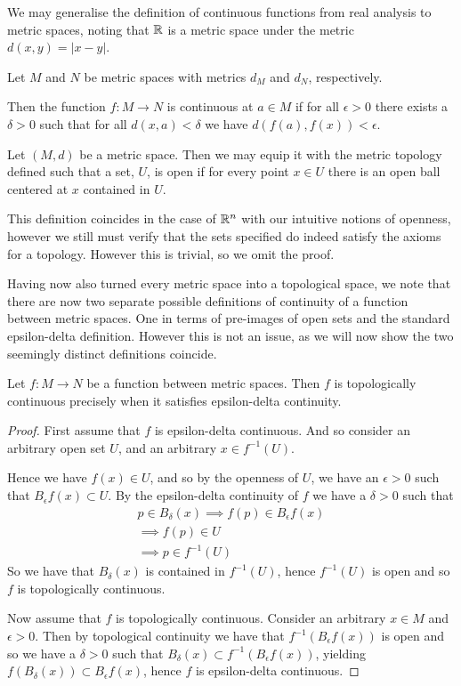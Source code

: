 \documentclass[]{article}
\begin{document}
We may generalise the definition of continuous functions from real analysis to metric spaces, noting that $\mathbb{R}$ is a metric space under the metric $d(x,y) = |x-y|$.

\begin{defi} [Continuity]
		Let $M$ and $N$ be metric spaces with metrics $d_M$ and $d_N$, respectively. 

		Then the function $f: M \to N$ is continuous at $a \in M$ if for all $\epsilon > 0$ there exists a $\delta > 0$ such that for all $d(x,a) < \delta$ we have $d(f(a), f(x)) < \epsilon$.
\end{defi}

\begin{defi} 
		Let $(M,d)$ be a metric space. Then we may equip it with the metric topology defined such that a set, $U$, is open if for every point $x \in U$ there is an open ball centered at $x$ contained in $U$.
\end{defi}

This definition coincides in the case of $\mathbb{R}^n$ with our intuitive notions of openness, however we still must verify that the sets specified do indeed satisfy the axioms for a topology. However this is trivial, so we omit the proof.

Having now also turned every metric space into a topological space, we note that there are now two separate possible definitions of continuity of a function between metric spaces. One in terms of pre-images of open sets and the standard epsilon-delta definition. 
However this is not an issue, as we will now show the two seemingly distinct definitions coincide.

\begin{thm}
	Let $f: M \to N$ be a function between metric spaces. Then $f$ is topologically continuous precisely when it satisfies epsilon-delta continuity.
\end{thm}

\begin{proof}
		First assume that $f$ is epsilon-delta continuous. And so consider an arbitrary open set $U$, and an arbitrary $x \in f^{-1}(U)$. 

		Hence we have $f(x) \in U$, and so by the openness of $U$, we have an $\epsilon > 0$ such that $B_\epsilon f(x) \subset U$. By the epsilon-delta continuity of $f$ we have a $\delta > 0$ such that 
		\begin{align*}
				p \in B_\delta(x) \implies f(p) \in B_\epsilon f(x) \\
				\implies f(p) \in U \\
				\implies p \in f^{-1}(U)
		\end{align*}
		So we have that $B_\delta (x)$ is contained in $f^{-1}(U)$, hence $f^{-1}(U)$ is open and so $f$ is topologically continuous.

		Now assume that $f$ is topologically continuous. Consider an arbitrary $x \in M$ and $\epsilon > 0$. Then by topological continuity we have that $f^{-1}(B_\epsilon f(x))$ is open and so we have a $\delta > 0$ such that $B_\delta(x) \subset f^{-1}(B_\epsilon f(x))$, yielding $f(B_\delta(x)) \subset B_\epsilon f(x)$, hence $f$ is epsilon-delta continuous.
\end{proof}
\end{document}
